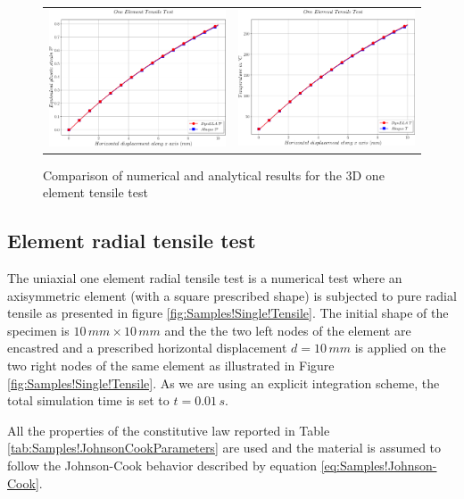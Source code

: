 \begin{figure}[h]
\begin{centering}
\begin{tabular}{cc}
\includegraphics[width=0.45\columnwidth]{Figures/Samples/Element/Tensile3D_plasticStrain} & \includegraphics[width=0.45\columnwidth]{Figures/Samples/Element/Tensile3D_temperature}\tabularnewline
\end{tabular}
\par\end{centering}
\caption{Comparison of numerical and analytical results for the 3D one element
tensile test\label{fig:Samples!Single!Tensile-Comparison-3D}}
\end{figure}


\subsection{Element radial tensile test}

The uniaxial one element radial tensile test is a numerical test where
an axisymmetric element (with a square prescribed shape) is subjected
to pure radial tensile as presented in figure \ref{fig:Samples!Single!Tensile}.
The initial shape of the specimen is $10\,mm\times10\,mm$ and the
the two left nodes of the element are encastred and a prescribed horizontal
displacement $d=10\,mm$ is applied on the two right nodes of the
same element as illustrated in Figure \ref{fig:Samples!Single!Tensile}.
As we are using an explicit integration scheme, the total simulation
time is set to $t=0.01\,s$.

All the properties of the constitutive law reported in Table \ref{tab:Samples!JohnsonCookParameters}
are used and the material is assumed to follow the Johnson-Cook behavior
described by equation \ref{eq:Samples!Johnson-Cook}.

